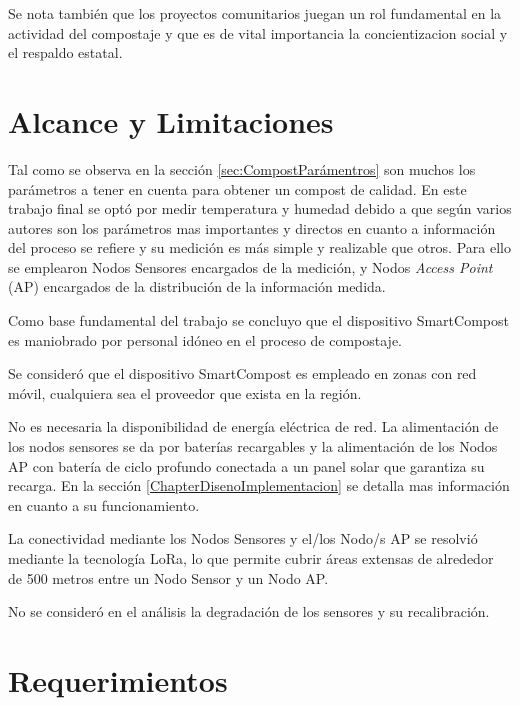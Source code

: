 Se nota también que los proyectos comunitarios juegan un rol fundamental en la actividad del compostaje y que es de vital importancia la concientizacion social y el respaldo estatal.


\section{Alcance y Limitaciones}
Tal como se observa en la sección \ref{sec:CompostParámentros} son muchos los parámetros a tener en cuenta para obtener un compost de calidad. En este trabajo final se optó por medir temperatura y humedad debido a que según varios autores \citep{Risti} \citep{FactoresCompost} \citep{ManualBuenasPracticas} son los parámetros mas importantes y directos en cuanto a información del proceso se refiere y su medición es más simple y realizable que otros. Para ello se emplearon Nodos Sensores encargados de la medición, y Nodos \textit{Access Point} (AP) encargados de la distribución de la información medida.

Como base fundamental del trabajo se concluyo que el dispositivo SmartCompost es maniobrado por personal idóneo en el proceso de compostaje.

Se consideró que el dispositivo SmartCompost es empleado en zonas con red móvil, cualquiera sea el proveedor que exista en la región. 

No es necesaria la disponibilidad de energía eléctrica de red. La alimentación de los nodos sensores se da por baterías recargables y la alimentación de los Nodos AP con batería de ciclo profundo conectada a un panel solar que garantiza su recarga. En la sección \ref{ChapterDisenoImplementacion} se detalla mas información en cuanto a su funcionamiento.

La conectividad mediante los Nodos Sensores y el/los Nodo/s AP se resolvió mediante la tecnología LoRa, lo que permite cubrir áreas extensas de alrededor de 500 metros entre un Nodo Sensor y un Nodo AP.



No se consideró en el análisis la degradación de los sensores y su recalibración.



\section{Requerimientos} %

